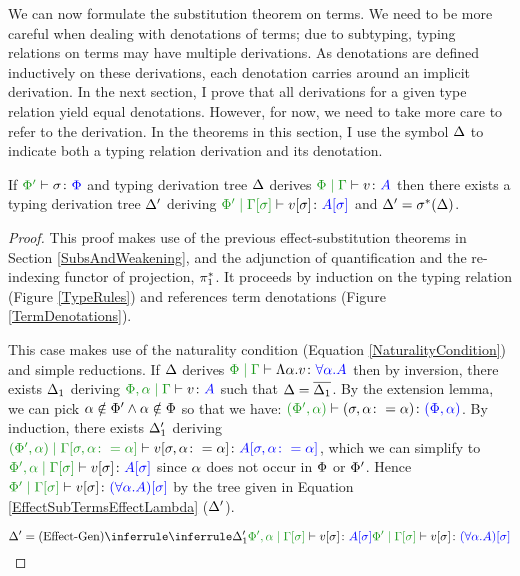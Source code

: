 \documentclass{Report}
\begin{document}
We can now formulate the substitution theorem on terms. We need to be more careful when dealing with denotations of terms; due to subtyping, typing relations on terms may have multiple derivations. As denotations are defined inductively on these derivations, each denotation carries around an implicit derivation. In the next section, I prove that all derivations for a given type relation yield equal denotations. However, for now, we need to take more care to refer to the derivation. In the theorems in this section, I use the symbol $\D$ to indicate both a typing relation derivation and its denotation.


\begin{framed}
    \begin{theorem}\label{EffectSubstitutionOnTerms}
        If $\typerelation{\P'}{\si}{\P}$ and typing derivation tree $\D$ derives $\gpetyperelation{v}{A}$ then there exists a typing derivation tree  $\D'$ deriving $\etyperelation{\P'}{\G\ssi}{v\ssi}{A\ssi}$ and $\D' = \si\star(\D)$.
    \end{theorem}
    
    
    \begin{proof}
        This proof makes use of the previous effect-substitution theorems in Section \ref{SubsAndWeakening}, and the adjunction of quantification and the re-indexing functor of projection, $\pstar$. It proceeds by induction on the typing relation (Figure \ref{TypeRules}) and references term denotations (Figure \ref{TermDenotations}).
    
        \case{\vgen}
    
    This case makes use of the naturality condition (Equation \ref{NaturalityCondition}) and simple reductions. 
    If $\D$ derives $\gpetyperelation{\elam{\a}{v}}{\all{\a}{A}}$ then by inversion, there exists $\D_1$ deriving  $\etyperelation{\P,\a}{\G}{v}{A}$ such that $\D = \bar{\D_1}$. By the extension lemma, we can pick $\a\notin\P'\wedge\a\notin\P$ so that we have: $\typerelation{(\P',\a)}{(\si, \a\setto\a)}{(\P,\a)}$. By induction, there exists $\D_1'$ deriving $\etyperelation{(\P', \a)}{\G\sub{\si, \a\setto\a}}{v\sub{\si,\a\setto\a}}{A\sub{\si, \a\setto\a}}$, which we can simplify to $\etyperelation{\P',\a}{\G\ssi}{v\ssi}{A\ssi}$ since $\a$ does not occur in $\P$ or $\P'$. Hence $\etyperelation{\P'}{\G\ssi}{v\ssi}{(\all{\a}{A})\ssi}$ by the tree given in Equation \ref{EffectSubTermsEffectLambda} ($\D'$).
    
    \begin{equation}\label{EffectSubTermsEffectLambda}
        \D' = \ntreeruleI{\vgen}{\treeruleI{\D_1'}{\etyperelation{\P',\a}{\G\ssi}{v\ssi}{A\ssi}}}{\etyperelation{\P'}{\G\ssi}{v\ssi}{(\all{\a}{A})\ssi}}
    \end{equation}
    

\end{proof}
\end{framed}
\end{document}
